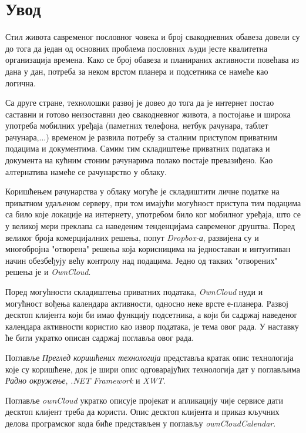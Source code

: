 \chapter{Увод}

Стил живота савременог пословног човека и број свакодневних обавеза довели су до тога да један од основних проблема пословних људи јесте квалитетна организација времена. Како се број обавеза и планираних активности повећава из дана у дан, потреба за неком врстом планера и подсетника се намеће као логична.

Са друге стране, технолошки развој је довео до тога да је интернет постао саставни и готово неизоставни део свакодневног живота, а постојање и широка употреба мобилних уређаја (паметних телефона, нетбук рачунара, таблет рачунара,...) временом је развила потребу за сталним приступом приватним подацима и документима. Самим тим складиштење приватних података и документа на кућним стоним рачунарима полако постаје превазиђено. Као алтернатива намеће се рачунарство у облаку.

Коришћењем рачунарства у облаку могуће је складиштити личне податке на приватном удаљеном серверу, при том имајући могућност приступа тим подацима са било које локације на интернету, употребом било ког мобилног уређаја, што се у великој мери преклапа са наведеним тенденцијама савременог друштва. Поред великог броја комерцијалних решења, попут \textit{Dropbox-а}, развијена су и многобројна "отворена" решења која корисницима на једноставан и интуитиван начин обезбеђују већу контролу над подацима. Једно од таквих "отворених" решења је и \textit{OwnCloud}. 

Поред могућности складиштења приватних података, \textit{OwnCloud} нуди и могућност вођења календара активности, односно неке врсте е-планера. Развој десктоп клијента који би имао функцију подсетника, а који би садржај наведеног календара активности користио као извор података, је тема овог рада. У наставку ће бити укратко описан садржај поглавља овог рада.

Поглавље \textit{Преглед коришћених технологија} представља кратак опис технологија које су коришћене, док је шири опис одговарајућих технологија дат у поглављима \textit{Радно окружење}, \textit{.NET Framework} и \textit{XWT}.

Поглавље \textit{ownCloud} укратко описује пројекат и апликацију чије сервисе дати десктоп клијент треба да користи. Опис десктоп клијента и приказ кључних делова програмског кода биће представљен у поглављу \textit{ownCloudCalendar}. 